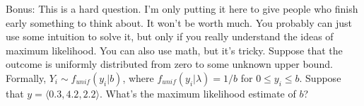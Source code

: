 \documentclass[10pt]{exam2}
\begin{document}
\begin{questions}
\question  Bonus: This is a hard question. I'm only putting it here to give people who finish early something to think about. It won't be worth much. You probably can just use some intuition to solve it, but only if you really understand the ideas of maximum likelihood. You can also use math, but it's tricky. Suppose that the outcome is uniformly distributed from zero to some unknown upper bound. Formally, $Y_i \sim f_{unif} (y_i | b)$, where $f_{unif}(y_i | \lambda) = 1/b$ for $0 \leq y_i \leq b$. Suppose that $y = \langle 0.3, 4.2, 2.2 \rangle$. What's the maximum likelihood estimate of $b$?

\end{questions}
\end{document}
